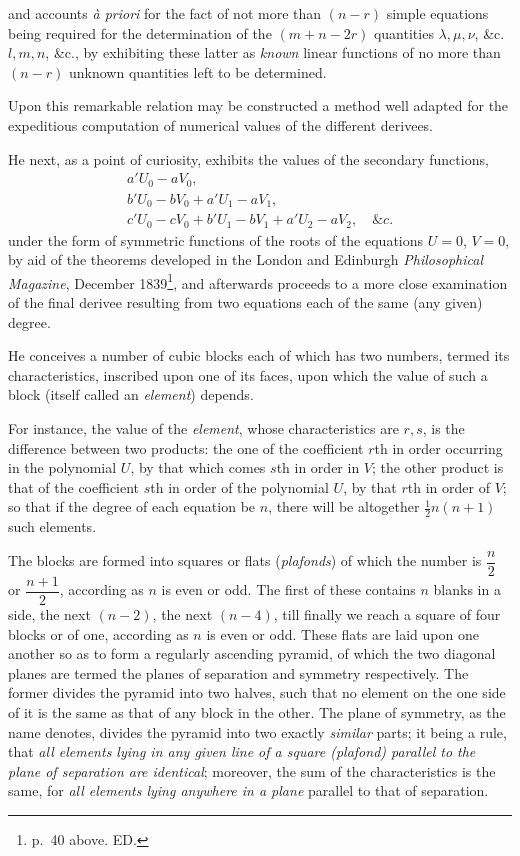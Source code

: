 \documentclass[11pt]{article}
\newcommand{\sourcepage}[1]{\marginpar{\scriptsize p.~#1}}
\begin{document}
\sourcepage{88}
and accounts \emph{\`a priori} for the fact of not more than $(n-r)$ simple equations being required for the determination of the $(m+n-2r)$ quantities $\lambda,\mu,\nu$, \&c. $l,m,n$, \&c., by exhibiting these latter as \emph{known} linear functions of no more than $(n-r)$ unknown quantities left to be determined.

Upon this remarkable relation may be constructed a method well adapted for the expeditious computation of numerical values of the different derivees.

He next, as a point of curiosity, exhibits the values of the secondary functions,
\[
\begin{gathered}
 a'U_0-aV_0,\\
 b'U_0-bV_0+a'U_1-aV_1,\\
 c'U_0-cV_0+b'U_1-bV_1+a'U_2-aV_2,\quad \&c.
\end{gathered}
\]
under the form of symmetric functions of the roots of the equations $U=0$, $V=0$, by aid of the theorems developed in the London and Edinburgh \emph{Philosophical Magazine}, December 1839\footnote{p.~40 above. ED.}, and afterwards proceeds to a more close examination of the final derivee resulting from two equations each of the same (any given) degree.

He conceives a number of cubic blocks each of which has two numbers, termed its characteristics, inscribed upon one of its faces, upon which the value of such a block (itself called an \emph{element}) depends.

For instance, the value of the \emph{element}, whose characteristics are $r,s$, is the difference between two products: the one of the coefficient $r$th in order occurring in the polynomial $U$, by that which comes $s$th in order in $V$; the other product is that of the coefficient $s$th in order of the polynomial $U$, by that $r$th in order of $V$; so that if the degree of each equation be $n$, there will be altogether $\frac12 n(n+1)$ such elements.

The blocks are formed into squares or flats (\emph{plafonds}) of which the number is $\dfrac{n}{2}$ or $\dfrac{n+1}{2}$, according as $n$ is even or odd. The first of these contains $n$ blanks in a side, the next $(n-2)$, the next $(n-4)$, till finally we reach a square of four blocks or of one, according as $n$ is even or odd. These flats are laid upon one another so as to form a regularly ascending pyramid, of which the two diagonal planes are termed the planes of separation and symmetry respectively. The former divides the pyramid into two halves, such that no element on the one side of it is the same as that of any block in the other. The plane of symmetry, as the name denotes, divides the pyramid into two exactly \emph{similar} parts; it being a rule, that \emph{all elements lying in any given line of a square (plafond) parallel to the plane of separation are identical}; moreover, the sum of the characteristics is the same, for \emph{all elements lying anywhere in a plane} parallel to that of separation.
\end{document}
